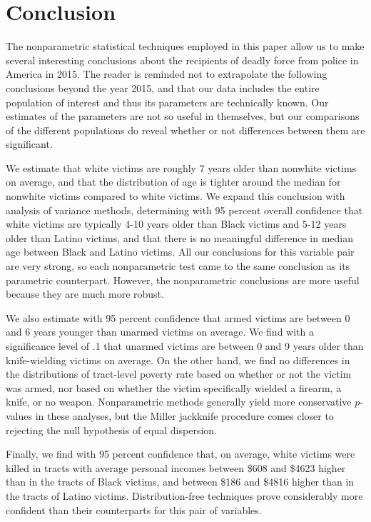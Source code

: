 
\section{Conclusion}

\par The nonparametric statistical techniques employed in this paper allow us to make several interesting conclusions about the recipients of deadly force from police in America in 2015. The reader is reminded not to extrapolate the following conclusions beyond the year 2015, and that our data includes the entire population of interest and thus its parameters are technically known. Our estimates of the parameters are not so useful in themselves, but our comparisons of the different populations do reveal whether or not differences between them are significant.

\par \bigskip We estimate that white victims are roughly 7 years older than nonwhite victims on average, and that the distribution of age is tighter around the median for nonwhite victims compared to white victims. We expand this conclusion with analysis of variance methods, determining with 95 percent overall confidence that white victims are typically 4-10 years older than Black victims and 5-12 years older than Latino victims, and that there is no meaningful difference in median age between Black and Latino victims. All our conclusions for this variable pair are very strong, so each nonparametric test came to the same conclusion as its parametric counterpart. However, the nonparametric conclusions are more useful because they are much more robust.

\par \bigskip We also estimate with 95 percent confidence that armed victims are between 0 and 6 years younger than unarmed victims on average. We find with a significance level of .1 that unarmed victims are between 0 and 9 years older than knife-wielding victims on average. On the other hand, we find no differences in the distributions of tract-level poverty rate based on whether or not the victim was armed, nor based on whether the victim specifically wielded a firearm, a knife, or no weapon. Nonparametric methods generally yield more conservative $p$-values in these analyses, but the Miller jackknife procedure comes closer to rejecting the null hypothesis of equal dispersion.

\par \bigskip Finally, we find with 95 percent confidence that, on average, white victims were killed in tracts with average personal incomes between \$608 and \$4623 higher than in the tracts of Black victims, and between \$186 and \$4816 higher than in the tracts of Latino victims. Distribution-free techniques prove considerably more confident than their counterparts for this pair of variables.


